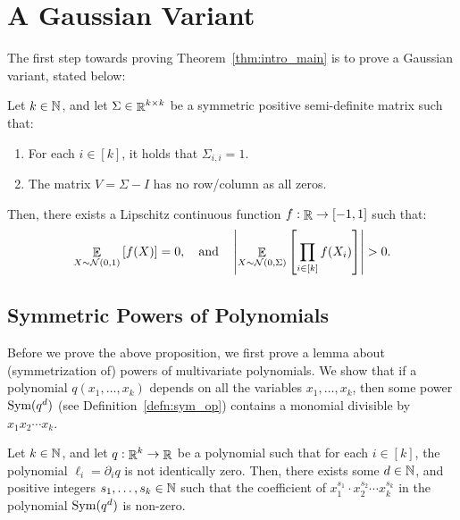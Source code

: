 \section{A Gaussian Variant}\label{sec:gaussian_variant}

The first step towards proving Theorem~\ref{thm:intro_main} is to prove a Gaussian variant, stated below:

\begin{proposition}\label{prop:gaussian_counter_eg}	
	Let $k\in \mathbb{N}$, and let $\Sigma\in \mathop{\mathbb{R}}^{k\times k}$ be a symmetric positive semi-definite matrix such that:
	\begin{enumerate}
		\item For each $i\in [k]$, it holds that $\Sigma_{i,i} = 1$.
		\item The matrix $V = \Sigma - I$ has no row/column as all zeros.
	\end{enumerate}
	
	Then, there exists a Lipschitz continuous function $f:\mathop{\mathbb{R}}\to [-1,1]$ such that:
	\[\mathop{\mathbb{E}}_{X\sim \mathcal N(0,1)} \left[ f(X) \right] = 0, \quad\text{and}\quad \left|\mathop{\mathbb{E}}_{X\sim \mathcal N(0, \Sigma)}\left[ \prod_{i\in [k]} f(X_i) \right]\right| > 0 .\]
\end{proposition}


\subsection{Symmetric Powers of Polynomials}

Before we prove the above proposition, we first prove a lemma about (symmetrization of) powers of multivariate polynomials.
We show that if a polynomial $q(x_1,\dots,x_k)$ depends on all the variables $x_1,\dots,x_k$, then some power $\textnormal{Sym}(q^d)$ (see Definition~\ref{defn:sym_op}) contains a monomial divisible by $x_1x_2\cdots x_k$.


\begin{lemma}\label{lemma:polynomial_all_var}
	Let $k\in \mathbb{N}$, and let $q:\mathop{\mathbb{R}}^k\to \mathop{\mathbb{R}}$ be a polynomial such that for each $i\in [k]$, the polynomial $\ell_i=\partial_iq$ is not identically zero.
	Then, there exists some $d\in \mathbb{N}$, and positive integers $s_1,\dots,s_k \in \mathbb{N}$ such that the coefficient of $x_1^{s_1}\cdot x_2^{s_2}\cdots x_k^{s_k}$ in the polynomial $\textnormal{Sym}(q^d)$ is non-zero.
\end{lemma}

